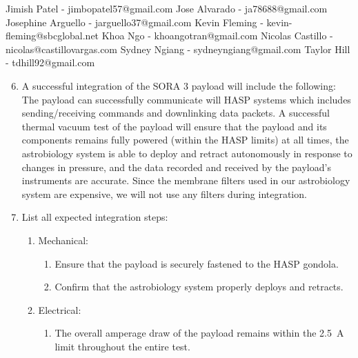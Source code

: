 \begin{minipage}{\linewidth-0.5cm}
\begin{enumerate}[label = \Alph*.]
    Jimish Patel - jimbopatel57@gmail.com \newline
    Jose Alvarado - ja78688@gmail.com \newline
    Josephine Arguello - jarguello37@gmail.com \newline
    Kevin Fleming - kevin-fleming@sbcglobal.net \newline
    Khoa Ngo - khoangotran@gmail.com \newline
    Nicolas Castillo - nicolas@castillovargas.com \newline
    Sydney Ngiang - sydneyngiang@gmail.com \newline
    Taylor Hill - tdhill92@gmail.com \newline    
  \end{enumerate}
\end{minipage}
\newpage
\begin{minipage}{\linewidth-0.5cm}
  \begin{enumerate}[label = \Alph*.] \setcounter{enumi}{5}
  \item A successful integration of the SORA 3 payload will include the following: \newline
    The payload can successfully communicate will HASP systems which includes sending/receiving commands and downlinking data packets. A successful thermal vacuum test of the payload will ensure that the payload and its components remains fully powered (within the HASP limits) at all times, the astrobiology system is able to deploy and retract autonomously in response to changes in pressure, and the data recorded and received by the payload's instruments are accurate. Since the membrane filters used in our astrobiology system are expensive, we will not use any filters during integration.    
  \item List all expected integration steps:
    \begin{enumerate}[label = -]
    \item Mechanical:
      \begin{enumerate}
      \item Ensure that the payload is securely fastened to the HASP gondola.
      \item Confirm that the astrobiology system properly deploys and retracts.
      \end{enumerate}
    \item Electrical:
      \begin{enumerate}
      \item The overall amperage draw of the payload remains within the \SI{2.5}{\ampere} limit throughout the entire test.

\end{enumerate}
\end{enumerate}
\end{enumerate}
\end{minipage}
